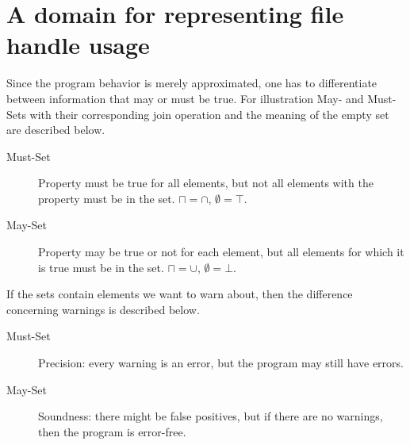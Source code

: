 \section{A domain for representing file handle usage}
Since the program behavior is merely approximated, one has to differentiate between information that may or must be true. For illustration May- and Must-Sets with their corresponding join operation and the meaning of the empty set are described below.
\begin{description}
\item[Must-Set] Property must be true for all elements, but not all elements with the property must be in the set. $\sqcap = \cap$, $\emptyset = \top$.
\item[May-Set] Property may be true or not for each element, but all elements for which  it is true must be in the set. $\sqcap = \cup$, $\emptyset = \bot$.
\end{description}
If the sets contain elements we want to warn about, then the difference concerning warnings is described below.
\begin{description}
\item[Must-Set] Precision: every warning is an error, but the program may still have errors.
\item[May-Set] Soundness: there might be false positives, but if there are no warnings, then the program is error-free.
\end{description}

